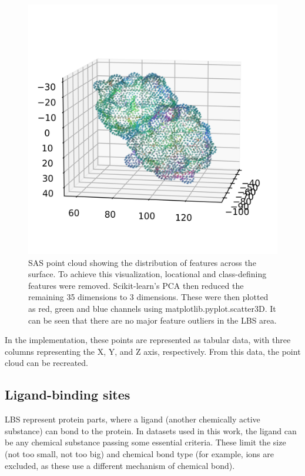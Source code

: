 \begin{figure}
    \centering
    \includegraphics[width=1\linewidth]{point_cloud_pca.png}
    \caption{SAS point cloud showing the distribution of features across the surface. To achieve this visualization, locational and class-defining features were removed. Scikit-learn's PCA then reduced the remaining 35 dimensions to 3 dimensions. These were then plotted as red, green and blue channels using matplotlib.pyplot.scatter3D. It can be seen that there are no major feature outliers in the LBS area.}
    \label{fig:pca_point_cloud}
\end{figure}

In the implementation, these points are represented as tabular data, with three columns representing the X, Y, and Z axis, respectively. From this data, the point cloud can be recreated.

\subsection{Ligand-binding sites}

LBS represent protein parts, where a ligand (another chemically active substance) can bond to the protein. In datasets used in this work, the ligand can be any chemical substance passing some essential criteria. These limit the size (not too small, not too big) and chemical bond type (for example, ions are excluded, as these use a different mechanism of chemical bond).

